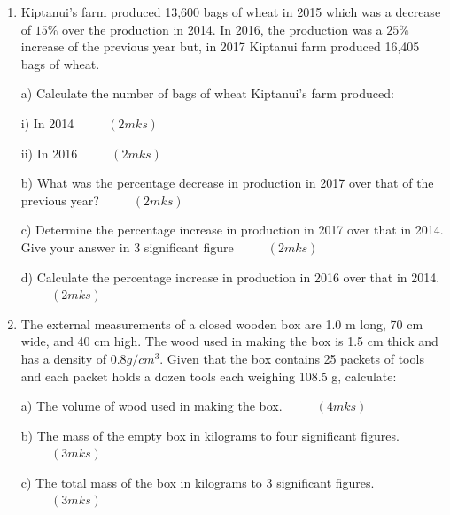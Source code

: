 \documentclass[
  a4paperpaper,
]{scrbook}
\begin{document}
\begin{tcolorbox}
\begin{enumerate}
  (b) Twenty five litres of water is added to the new solution.
  Calculate the percentage of milk in the resulting solution.
  \(\hspace{1cm} (2mks)\)

  (c) If 8 litres of the solution in (b) above is added to 16 litres of
  the original solution, calculate in the simplest form, the ratio of
  water to milk in the resulting solution. \(\hspace{1cm}(4mks)\)
\item
  Kiptanui's farm produced 13,600 bags of wheat in 2015 which was a
  decrease of \(15\%\) over the production in 2014. In 2016, the
  production was a \(25\%\) increase of the previous year but, in 2017
  Kiptanui farm produced 16,405 bags of wheat.

  a) Calculate the number of bags of wheat Kiptanui's farm produced:

  i) In 2014 \(\hspace{1cm}(2mks)\)

  ii) In 2016 \(\hspace{1cm} (2mks)\)

  b) What was the percentage decrease in production in 2017 over that of
  the previous year? \(\hspace{1cm} (2mks)\)

  c) Determine the percentage increase in production in 2017 over that
  in 2014. Give your answer in 3 significant figure
  \(\hspace{1cm} (2mks)\)

  d) Calculate the percentage increase in production in 2016 over that
  in 2014. \(\hspace{1cm} (2mks)\)
\item
  The external measurements of a closed wooden box are 1.0 m long, 70 cm
  wide, and 40 cm high. The wood used in making the box is 1.5 cm thick
  and has a density of \(0.8 g/cm^3\). Given that the box contains 25
  packets of tools and each packet holds a dozen tools each weighing
  108.5 g, calculate:

  a) The volume of wood used in making the box. \(\hspace{1cm} (4mks)\)

  b) The mass of the empty box in kilograms to four significant figures.
  \(\hspace{1cm}(3mks)\)

  c) The total mass of the box in kilograms to 3 significant figures.
  \(\hspace{1cm} (3mks)\)
\end{enumerate}

\end{tcolorbox}
\end{document}
